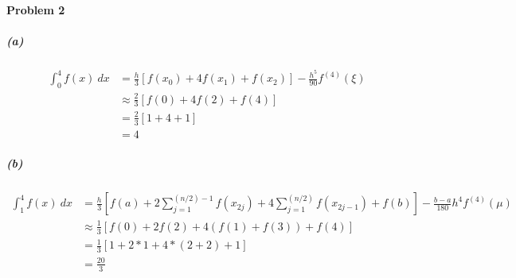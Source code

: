 \documentclass{article}
\begin{document}
\paragraph{Problem 2}
\subparagraph*{(a)} 
\begin{equation}\nonumber
\begin{split}
\int_{0}^{4} f(x)\ dx &= \frac{h}{3}[f(x_0)+4f(x_1)+f(x_2)]-\frac{h^5}{90}f^{(4)}(\xi)  \\
&\approx \frac{2}{3}[f(0)+4f(2)+f(4)] \\
&= \frac{2}{3}[1+4+1] \\
&= 4
\end{split}
\end{equation}

\subparagraph*{(b)}
\begin{equation}\nonumber
\begin{split}
\int_{1}^{4} f(x)\ dx &= \frac{h}{3}[f(a)+2\sum_{j=1}^{(n/2)-1}f(x_{2j}) +4\sum_{j=1}^{(n/2)}f(x_{2j-1})+f(b)]-\frac{b-a}{180}h^4f^{(4)}(\mu) \\
&\approx \frac{1}{3} [f(0)+2f(2)+4(f(1)+f(3))+f(4)] \\
&=\frac{1}{3}[1+2*1+4*(2+2)+1] \\
&= \frac{20}{3}
\end{split}
\end{equation}
\end{document}
